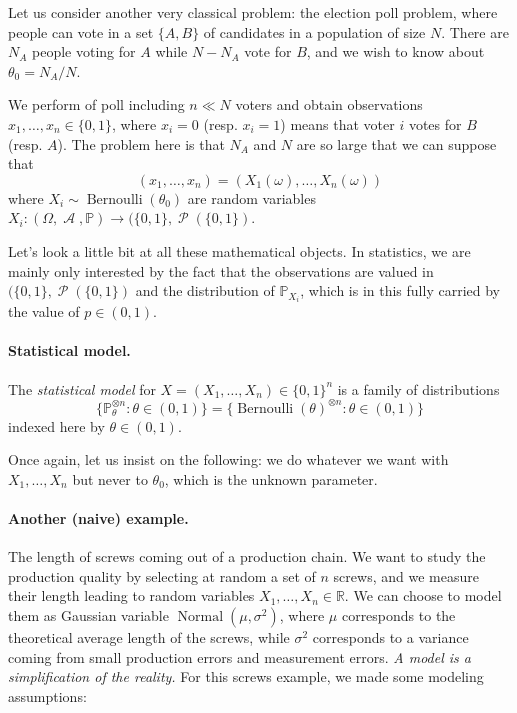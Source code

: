 \documentclass[
	fontsize=11pt, %
	twoside=false, %
	numbers=noenddot, %
]{kaobook}
\DeclareMathOperator{\cA}{\mathcal A}
\DeclareMathOperator{\cP}{\mathcal P}
\DeclareMathOperator{\nor}{Normal}
\DeclareMathOperator{\ber}{Bernoulli}
\renewcommand{\P}{\mathbb P}
\newcommand{\R}{\mathbb R}
\begin{document}
Let us consider another very classical problem: the election poll problem, where people can vote in a set $\{A, B\}$ of candidates in a population of size $N$.
There are $N_A$ people voting for $A$ while $N - N_A$ vote for $B$, and we wish to know about $\theta_0 = N_A / N$.

We perform of poll including $n \ll N$ voters and obtain observations $x_1, \ldots, x_n \in \{ 0, 1 \}$, where $x_i = 0$ (resp. $x_i = 1$) means that voter $i$ votes for $B$ (resp. $A$).
The problem here is that $N_A$ and $N$ are so large that we can suppose that
\begin{equation*}
	(x_1, \ldots, x_n) = (X_1(\omega), \ldots, X_n(\omega))
\end{equation*}
where $X_i \sim \ber(\theta_0)$ are random variables $X_i : (\Omega, \cA, \P) \rightarrow (\{0, 1\}, \cP(\{ 0, 1\})$.

Let's look a little bit at all these mathematical objects. 
In statistics, we are mainly only interested by the fact that the observations are valued in $(\{0, 1\}, \cP(\{ 0, 1\})$ and the distribution of $\P_{X_i}$, which is in this fully carried by the value of $p \in (0, 1)$.
\todo{dire qu'on s'en fout de $\Omega, \cA, \P$ etc.}

\paragraph{Statistical model.}

The \emph{statistical model} for $X = (X_1, \ldots, X_n) \in \{0, 1\}^n$ is a family of distributions
\begin{equation}
	\{ \P_\theta^{\otimes n} : \theta \in (0, 1) \}	= \{ \ber(\theta)^{\otimes n} : \theta \in (0, 1) \}
\end{equation}
indexed here by $\theta \in (0, 1)$.

Once again, let us insist on the following: we do whatever we want with $X_1, \ldots, X_n$ but never to $\theta_0$, which is the unknown parameter.


\paragraph{Another (naive) example.}

The length of screws coming out of a production chain.
We want to study the production quality by selecting at random a set of $n$ screws, and we measure their length leading to random variables $X_1, \ldots, X_n \in \R$.
We can choose to model them as Gaussian variable $\nor(\mu, \sigma^2)$, where $\mu$ corresponds to the theoretical average length of the screws, while $\sigma^2$ corresponds to a variance coming from small production errors and measurement errors.
\emph{A model is a simplification of the reality.} For this screws example, we made some modeling assumptions:
\end{document}
